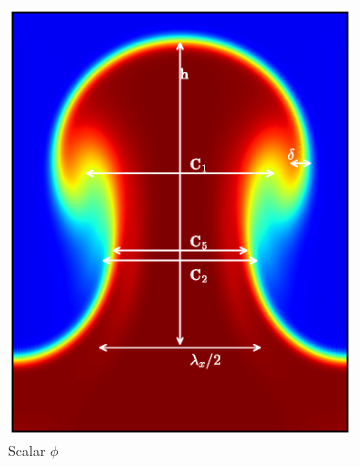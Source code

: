 \begin{figure}
\begin{subfigure}[b]{\columnwidth}
\includegraphics[width=\columnwidth]{figs/slice}
\caption{Scalar $\phi$}
\end{subfigure}
\begin{subfigure}[b]{\columnwidth}

\end{subfigure}
\end{figure}
